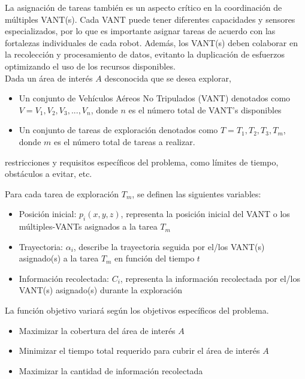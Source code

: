 \documentclass[11pt,epsf,times]{article}
\begin{document}
La asignaci\'{o}n de tareas tambi\'{e}n es un aspecto cr\'{i}tico en la coordinaci\'{o}n de m\'{u}ltiples VANT(s). Cada VANT puede tener diferentes capacidades y sensores especializados, por lo que es importante asignar tareas de acuerdo con las fortalezas individuales de cada robot. Adem\'{a}s, los VANT(s) deben colaborar en la recolecci\'{o}n y procesamiento de datos, evitanto la duplicaci\'{o}n de esfuerzos optimizando el uso de los recursos disponibles.\\

Dada un \'{a}rea de inter\'{e}s $A$ desconocida que se desea explorar,
\begin{itemize}
\item Un conjunto de Veh\'{i}culos A\'{e}reos No Tripulados (VANT) denotados como $V = V_{1},V_{2},V_{3},...,V_{n}$, donde $n$ es el n\'{u}mero total de VANT's disponibles
\item Un conjunto de tareas de exploraci\'{o}n denotados como $T = T_{1}, T_{2}, T_{3}, T_{m}$, donde $m$ es el n\'{u}mero total de tareas a realizar.
\end{itemize}

restricciones y requisitos espec\'{i}ficos del problema, como l\'{i}mites de tiempo, obst\'{a}culos a evitar, etc.

Para cada tarea de exploraci\'{o}n $T_{m}$, se definen las siguientes variables:

\begin{itemize}
\item Posici\'{o}n inicial: $p_{i}(x,y,z)$, representa la posici\'{o}n inicial del VANT o los m\'{u}ltiples-VANTs asignados a la tarea $T_{m}$
\item Trayectoria: $\alpha_{i}$, describe la trayectoria seguida por el/los VANT(s) asignado(s) a la tarea $T_{m}$ en funci\'{o}n del tiempo $t$
\item Informaci\'{o}n recolectada: $C_{i}$, representa la informaci\'{o}n recolectada por el/los VANT(s) asignado(s) durante la exploraci\'{o}n
\end{itemize}

La funci\'{o}n objetivo variar\'{a} seg\'{u}n los objetivos espec\'{i}ficos del problema.
\begin{itemize}
\item Maximizar la cobertura del \'{a}rea de inter\'{e}s $A$
\item Minimizar el tiempo total requerido para cubrir el \'{a}rea de inter\'{e}s $A$
\item Maximizar la cantidad de informaci\'{o}n recolectada
\end{itemize}
\end{document}
